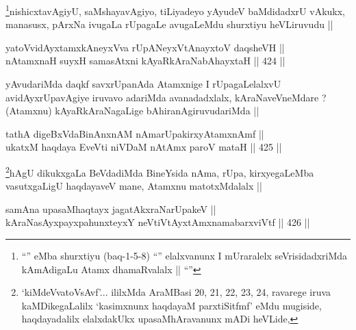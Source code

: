 \begin{artha}
\footnote{``\stext'' eMba shurxtiyu (baq-1-5-8) ``\stext'' elalxvanunx
  I mUraralelx seVrisidadxriMda kAmAdigaLu Atamx dhamaRvalalx ||
  ``\stext''}nishicxtavAgiyU, saMshayavAgiyo, tiLiyadeyo yAyudeV
baMdidadxrU vAkukx, manasusx, pArxNa ivugaLa rUpagaLe avugaLeMdu
shurxtiyu heVLiruvudu ||
\end{artha}

\begin{shl}
yatoV\s vidAyxtamxkAneyxVva rUpANeyxVtAnayxtoV daqsheVH || \\
nA\s \s tamxnaH suyxH samasAtxni kAyaRkAraNabAhayxtaH ||  424 || 
\end{shl}

\begin{artha}
yAvudariMda daqkf savxrUpanAda Atamxnige I rUpagaLelalxvU
avidAyxrUpavAgiye iruvavo adariMda avanadadxlalx, kAraNaveVneMdare ?
(Atamxnu) kAyaRkAraNagaLige bAhiranAgiruvudariMda ||
\end{artha}


\begin{shl}
tathA digeBxVdaBinAnxnAM nAmarUpakirxyAtamxnAmf || \\
ukatxM haqdaya EveVti niVDaM nA\s \s tAmx paroV mataH ||  425 ||  
\end{shl}

\begin{artha}
\footnote{`kiMdeVvatoV\s sAvf'... ililxMda AraMBasi 20, 21, 22, 23,
  24, ravarege iruva kaMDikegaLalilx `kasimxnunx haqdayaM
  parxtiSitfmf' eMdu mugiside, haqdayadalilx elalxdakUkx
  upasaMhAravanunx mADi heVLide,}hAgU dikukxgaLa BeVdadiMda BineYsida nAma, rUpa,
kirxyegaLeMba vasutxgaLigU haqdayaveV mane, Atamxnu matotxMdalalx ||
\end{artha}


\begin{shl}
samAna upasaMhaqtayx jagatAkxraNarUpakeV || \\
kAraNasAyxpayxpahunxteyxY neVtiVtAyxtAmxnamabarxviVtf ||  426 ||  
\end{shl}

